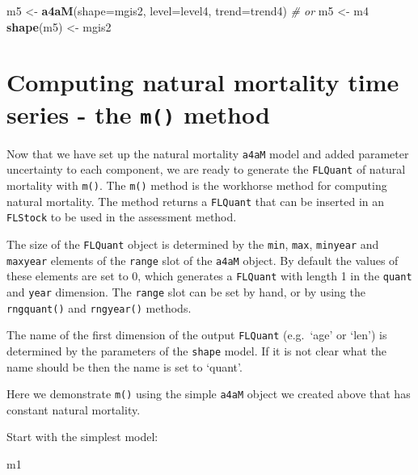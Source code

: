 \documentclass[
]{book}
\newenvironment{Shaded}{\begin{snugshade}}{\end{snugshade}}
\newcommand{\AttributeTok}[1]{\textcolor[rgb]{0.13,0.29,0.53}{#1}}
\newcommand{\CommentTok}[1]{\textcolor[rgb]{0.56,0.35,0.01}{\textit{#1}}}
\newcommand{\FunctionTok}[1]{\textcolor[rgb]{0.13,0.29,0.53}{\textbf{#1}}}
\newcommand{\NormalTok}[1]{#1}
\newcommand{\OtherTok}[1]{\textcolor[rgb]{0.56,0.35,0.01}{#1}}
\begin{document}
\begin{Shaded}
\begin{Highlighting}[]
\NormalTok{m5 }\OtherTok{\textless{}{-}} \FunctionTok{a4aM}\NormalTok{(}\AttributeTok{shape=}\NormalTok{mgis2, }\AttributeTok{level=}\NormalTok{level4, }\AttributeTok{trend=}\NormalTok{trend4)}
\CommentTok{\# or}
\NormalTok{m5 }\OtherTok{\textless{}{-}}\NormalTok{ m4}
\FunctionTok{shape}\NormalTok{(m5) }\OtherTok{\textless{}{-}}\NormalTok{ mgis2}
\end{Highlighting}
\end{Shaded}

\hypertarget{computing-natural-mortality-time-series---the-m-method}{%
\section{\texorpdfstring{Computing natural mortality time series - the \texttt{m()} method}{Computing natural mortality time series - the m() method}}\label{computing-natural-mortality-time-series---the-m-method}}

Now that we have set up the natural mortality \texttt{a4aM} model and added parameter uncertainty to each component, we are ready to generate the \texttt{FLQuant} of natural mortality with \texttt{m()}. The \texttt{m()} method is the workhorse method for computing natural mortality. The method returns a \texttt{FLQuant} that can be inserted in an \texttt{FLStock} to be used in the assessment method.

The size of the \texttt{FLQuant} object is determined by the \texttt{min}, \texttt{max}, \texttt{minyear} and \texttt{maxyear} elements of the \texttt{range} slot of the \texttt{a4aM} object. By default the values of these elements are set to 0, which generates a \texttt{FLQuant} with length 1 in the \texttt{quant} and \texttt{year} dimension. The \texttt{range} slot can be set by hand, or by using the \texttt{rngquant()} and \texttt{rngyear()} methods.

The name of the first dimension of the output \texttt{FLQuant} (e.g.~`age' or `len') is determined by the parameters of the \texttt{shape} model. If it is not clear what the name should be then the name is set to `quant'.

Here we demonstrate \texttt{m()} using the simple \texttt{a4aM} object we created above that has constant natural mortality.

Start with the simplest model:

\begin{Shaded}
\begin{Highlighting}[]
\NormalTok{m1}
\end{Highlighting}
\end{Shaded}
\end{document}

